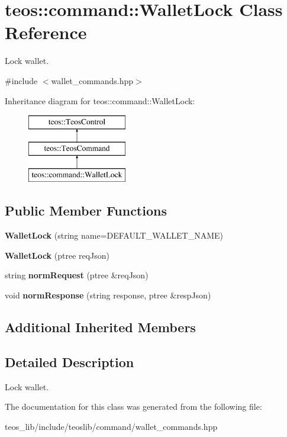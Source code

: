 \hypertarget{classteos_1_1command_1_1_wallet_lock}{}\section{teos\+:\+:command\+:\+:Wallet\+Lock Class Reference}
\label{classteos_1_1command_1_1_wallet_lock}


Lock wallet.  




{\ttfamily \#include $<$wallet\+\_\+commands.\+hpp$>$}

Inheritance diagram for teos\+:\+:command\+:\+:Wallet\+Lock\+:\begin{figure}[H]
\begin{center}
\leavevmode
\includegraphics[height=3.000000cm]{classteos_1_1command_1_1_wallet_lock}
\end{center}
\end{figure}
\subsection*{Public Member Functions}
\begin{DoxyCompactItemize}
\item 
\mbox{\label{classteos_1_1command_1_1_wallet_lock_a5e80a3195774c7911d716ff4fa41a4e7}} 
{\bfseries Wallet\+Lock} (string name=D\+E\+F\+A\+U\+L\+T\+\_\+\+W\+A\+L\+L\+E\+T\+\_\+\+N\+A\+ME)
\item 
\mbox{\label{classteos_1_1command_1_1_wallet_lock_a37c8f6a1c32d651c2ef1f2aabfd9207d}} 
{\bfseries Wallet\+Lock} (ptree req\+Json)
\item 
\mbox{\label{classteos_1_1command_1_1_wallet_lock_aa2f7dbb10a35e4817467f2b4b95a0b95}} 
string {\bfseries norm\+Request} (ptree \&req\+Json)
\item 
\mbox{\label{classteos_1_1command_1_1_wallet_lock_afa87feb8243bc8ccdaf3438ba4817a9d}} 
void {\bfseries norm\+Response} (string response, ptree \&resp\+Json)
\end{DoxyCompactItemize}
\subsection*{Additional Inherited Members}


\subsection{Detailed Description}
Lock wallet. 

The documentation for this class was generated from the following file\+:\begin{DoxyCompactItemize}
\item 
teos\+\_\+lib/include/teoslib/command/wallet\+\_\+commands.\+hpp\end{DoxyCompactItemize}
